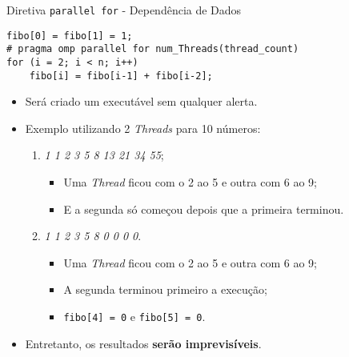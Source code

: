 \begin{frame}[fragile]{Diretiva {\tt parallel for}  - Dependência de Dados}
	\begin{lstlisting}
fibo[0] = fibo[1] = 1;
# pragma omp parallel for num_Threads(thread_count)
for (i = 2; i < n; i++)
	fibo[i] = fibo[i-1] + fibo[i-2];
	\end{lstlisting}

		\pause

	\begin{itemize}
		\item Será criado um executável sem qualquer alerta.

			\pause
%
%
		\item Exemplo utilizando 2 \textit{Threads} para 10 números:
		\begin{enumerate}
			\item \textit{1 1 2 3 5 8 13 21 34 55};
			\begin{itemize}
				\pause
				\item Uma \textit{Thread} ficou com o 2 ao 5 e outra com 6 ao 9;
				\item E a segunda só começou depois que a primeira terminou.
			\end{itemize}

				\pause

			\item \textit{1 1 2 3 5 8 0 0 0 0}.
			\begin{itemize}
				\pause
				\item Uma \textit{Thread} ficou com o 2 ao 5 e outra com 6 ao 9;
				\pause
				\item A segunda terminou primeiro a execução;
				\item {\tt fibo[4] = 0} e  {\tt fibo[5] = 0}.
			\end{itemize}
		\end{enumerate}

            \pause
            \bigskip

		\item Entretanto, os resultados {\bf serão imprevisíveis}.
	\end{itemize}
\end{frame}




